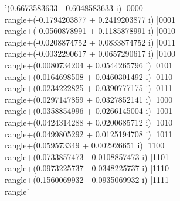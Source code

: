 '(0.6673583633 - 0.6048583633 i) |0000\\rangle+(-0.1794203877 + 0.2419203877 i) |0001\\rangle+(-0.0560878991 + 0.1185878991 i) |0010\\rangle+(-0.0208874752 + 0.0833874752 i) |0011\\rangle+(-0.0032290617 + 0.0657290617 i) |0100\\rangle+(0.0080734204 + 0.0544265796 i) |0101\\rangle+(0.0164698508 + 0.0460301492 i) |0110\\rangle+(0.0234222825 + 0.0390777175 i) |0111\\rangle+(0.0297147859 + 0.0327852141 i) |1000\\rangle+(0.0358854996 + 0.0266145004 i) |1001\\rangle+(0.0424314288 + 0.0200685712 i) |1010\\rangle+(0.0499805292 + 0.0125194708 i) |1011\\rangle+(0.059573349 + 0.002926651 i) |1100\\rangle+(0.0733857473 - 0.0108857473 i) |1101\\rangle+(0.0973225737 - 0.0348225737 i) |1110\\rangle+(0.1560069932 - 0.0935069932 i) |1111\\rangle'
